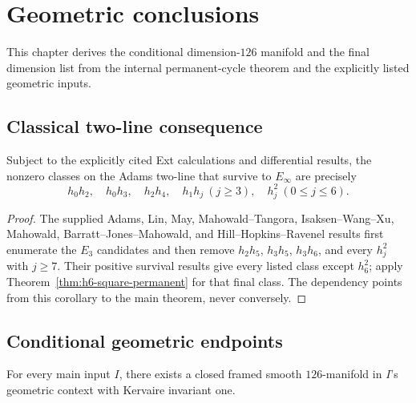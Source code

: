 \chapter{Geometric conclusions}
\label{chap:final-kervaire}

This chapter derives the conditional dimension-$126$ manifold and the final dimension list from the internal permanent-cycle theorem and the explicitly listed geometric inputs.

\section{Classical two-line consequence}

\begin{corollary}
  \label{cor:adams-two-line-survivors}
  \notready
  Subject to the explicitly cited Ext calculations and differential results,
  the nonzero classes on the Adams two-line that survive to $E_\infty$ are
  precisely
  \[
    h_0h_2,\quad h_0h_3,\quad h_2h_4,\quad
    h_1h_j\ (j\ge3),\quad h_j^2\ (0\le j\le6).
  \]
\end{corollary}

\begin{proof}
  The supplied Adams, Lin, May, Mahowald--Tangora, Isaksen--Wang--Xu,
  Mahowald, Barratt--Jones--Mahowald, and Hill--Hopkins--Ravenel results first
  enumerate the $E_3$ candidates and then remove $h_2h_5$, $h_3h_5$,
  $h_3h_6$, and every $h_j^2$ with $j\ge7$.  Their positive survival results
  give every listed class except $h_6^2$; apply
  Theorem~\ref{thm:h6-square-permanent} for that final class.  The dependency
  points from this corollary to the main theorem, never conversely.
\end{proof}

\section{Conditional geometric endpoints}

\begin{theorem}
  \label{thm:kervaire-126-conditional}
  \notready
  For every main input $I$, there exists a closed framed smooth
  $126$-manifold in $I$'s geometric context with Kervaire invariant one.
\end{theorem}

